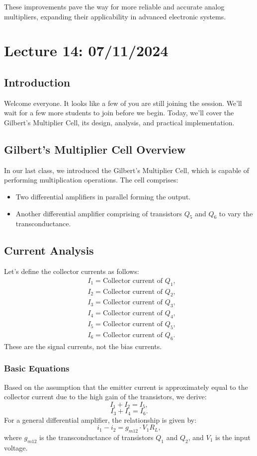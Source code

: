 These improvements pave the way for more reliable and accurate analog multipliers, expanding their applicability in advanced electronic systems.
\newpage
\section{Lecture 14: 07/11/2024}

\subsection{Introduction}
Welcome everyone. It looks like a few of you are still joining the session. We'll wait for a few more students to join before we begin. Today, we'll cover the Gilbert's Multiplier Cell, its design, analysis, and practical implementation.

\subsection{Gilbert's Multiplier Cell Overview}
In our last class, we introduced the Gilbert's Multiplier Cell, which is capable of performing multiplication operations. The cell comprises:
\begin{itemize}
    \item Two differential amplifiers in parallel forming the output.
    \item Another differential amplifier comprising of transistors $Q_5$ and $Q_6$ to vary the transconductance.
\end{itemize}

\subsection{Current Analysis}
Let’s define the collector currents as follows:
\begin{align*}
    &I_1 = \text{Collector current of } Q_1, \\
    &I_2 = \text{Collector current of } Q_2, \\
    &I_3 = \text{Collector current of } Q_3, \\
    &I_4 = \text{Collector current of } Q_4, \\
    &I_5 = \text{Collector current of } Q_5, \\
    &I_6 = \text{Collector current of } Q_6.
\end{align*}
These are the signal currents, not the bias currents.

\subsubsection{Basic Equations}
Based on the assumption that the emitter current is approximately equal to the collector current due to the high gain of the transistors, we derive:
\[
I_1 + I_2 = I_5,
\]
\[
I_3 + I_4 = I_6.
\]
For a general differential amplifier, the relationship is given by:
\[
i_1 - i_2 = g_{m12} \cdot V_1 R_L,
\]
where $g_{m12}$ is the transconductance of transistors $Q_1$ and $Q_2$, and $V_1$ is the input voltage.

